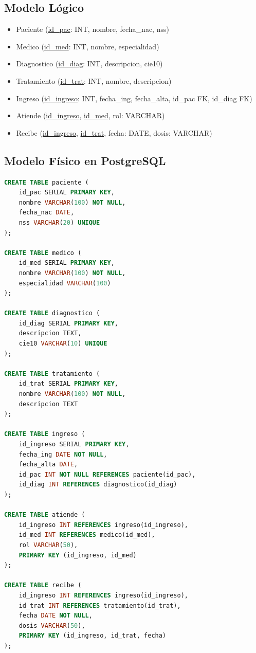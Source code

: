 \documentclass[12pt,a4paper,openany,oneside]{book}
\begin{document}
\subsection{Modelo Lógico}
\begin{itemize}
    \item Paciente (\underline{id\_pac}: INT, nombre, fecha\_nac, nss)
    \item Medico (\underline{id\_med}: INT, nombre, especialidad)
    \item Diagnostico (\underline{id\_diag}: INT, descripcion, cie10)
    \item Tratamiento (\underline{id\_trat}: INT, nombre, descripcion)
    \item Ingreso (\underline{id\_ingreso}: INT, fecha\_ing, fecha\_alta, id\_pac FK, id\_diag FK)
    \item Atiende (\underline{id\_ingreso}, \underline{id\_med}, rol: VARCHAR)
    \item Recibe (\underline{id\_ingreso}, \underline{id\_trat}, fecha: DATE, dosis: VARCHAR)
\end{itemize}

\subsection{Modelo Físico en PostgreSQL}
\begin{lstlisting}[language=SQL]
CREATE TABLE paciente (
    id_pac SERIAL PRIMARY KEY,
    nombre VARCHAR(100) NOT NULL,
    fecha_nac DATE,
    nss VARCHAR(20) UNIQUE
);

CREATE TABLE medico (
    id_med SERIAL PRIMARY KEY,
    nombre VARCHAR(100) NOT NULL,
    especialidad VARCHAR(100)
);

CREATE TABLE diagnostico (
    id_diag SERIAL PRIMARY KEY,
    descripcion TEXT,
    cie10 VARCHAR(10) UNIQUE
);

CREATE TABLE tratamiento (
    id_trat SERIAL PRIMARY KEY,
    nombre VARCHAR(100) NOT NULL,
    descripcion TEXT
);

CREATE TABLE ingreso (
    id_ingreso SERIAL PRIMARY KEY,
    fecha_ing DATE NOT NULL,
    fecha_alta DATE,
    id_pac INT NOT NULL REFERENCES paciente(id_pac),
    id_diag INT REFERENCES diagnostico(id_diag)
);

CREATE TABLE atiende (
    id_ingreso INT REFERENCES ingreso(id_ingreso),
    id_med INT REFERENCES medico(id_med),
    rol VARCHAR(50),
    PRIMARY KEY (id_ingreso, id_med)
);

CREATE TABLE recibe (
    id_ingreso INT REFERENCES ingreso(id_ingreso),
    id_trat INT REFERENCES tratamiento(id_trat),
    fecha DATE NOT NULL,
    dosis VARCHAR(50),
    PRIMARY KEY (id_ingreso, id_trat, fecha)
);
\end{lstlisting}
\end{document}
